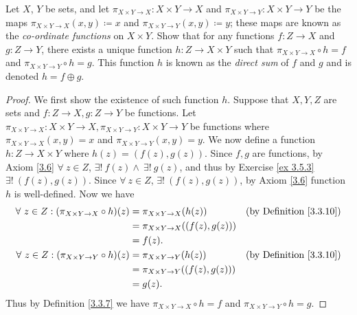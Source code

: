 \begin{exercise}\label{ex 3.5.7}
    Let \(X\), \(Y\) be sets, and let \(\pi_{X \times Y \to X} : X \times Y \to X\) and \(\pi_{X \times Y \to Y} : X \times Y \to Y\) be the maps \(\pi_{X \times Y \to X}(x, y) \coloneqq x\) and \(\pi_{X \times Y \to Y}(x, y) \coloneqq y\);
    these maps are known as the \emph{co-ordinate functions} on \(X \times Y\).
    Show that for any functions \(f : Z \to X\) and \(g : Z \to Y\), there exists a unique function \(h : Z \to X \times Y\) such that \(\pi_{X \times Y \to X} \circ h = f\) and \(\pi_{X \times Y \to Y} \circ h = g\).
    This function \(h\) is known as the \emph{direct sum} of \(f\) and \(g\) and is denoted \(h = f \oplus g\).
\end{exercise}

\begin{proof}
    We first show the existence of such function \(h\).
    Suppose that \(X, Y, Z\) are sets and \(f : Z \to X, g : Z \to Y\) be functions.
    Let \(\pi_{X \times Y \to X} : X \times Y \to X, \pi_{X \times Y \to Y} : X \times Y \to Y\) be functions where \(\pi_{X \times Y \to X}(x, y) = x\) and \(\pi_{X \times Y \to Y}(x, y) = y\).
    We now define a function \(h : Z \to X \times Y\) where \(h(z) = (f(z), g(z))\).
    Since \(f, g\) are functions, by Axiom \ref{3.6} \(\forall\ z \in Z\), \(\exists!\ f(z) \land \ \exists!\ g(z)\), and thus by Exercise \ref{ex 3.5.3} \(\exists!\ (f(z), g(z))\).
    Since \(\forall\ z \in Z\), \(\exists!\ (f(z), g(z))\), by Axiom \ref{3.6} function \(h\) is well-defined.
    Now we have
    \begin{align*}
        \forall\ z \in Z : (\pi_{X \times Y \to X} \circ h)(z) & = \pi_{X \times Y \to X}(h(z))         & \text{(by Definition \ref{3.3.10})} \\
                                                               & = \pi_{X \times Y \to X}((f(z), g(z)))                                       \\
                                                               & = f(z).                                                                      \\
        \forall\ z \in Z : (\pi_{X \times Y \to Y} \circ h)(z) & = \pi_{X \times Y \to Y}(h(z))         & \text{(by Definition \ref{3.3.10})} \\
                                                               & = \pi_{X \times Y \to Y}((f(z), g(z)))                                       \\
                                                               & = g(z).
    \end{align*}
    Thus by Definition \ref{3.3.7} we have \(\pi_{X \times Y \to X} \circ h = f\) and \(\pi_{X \times Y \to Y} \circ h = g\).


\end{proof}
